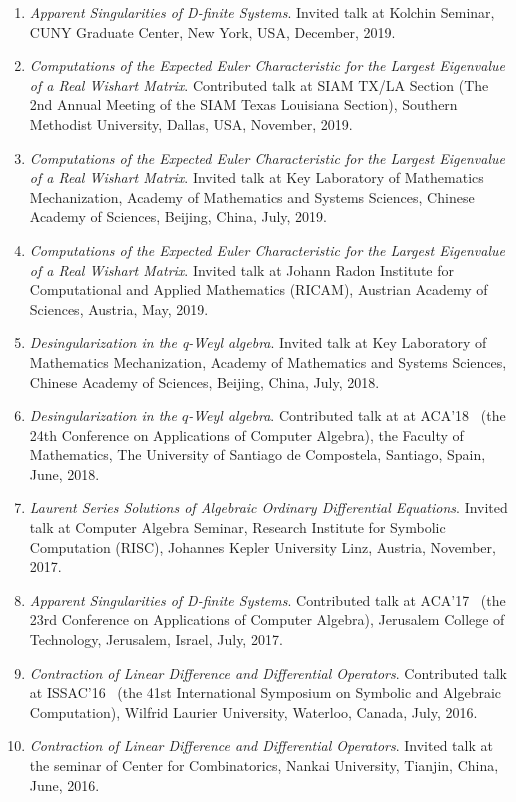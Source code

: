 \documentclass[a4paper,12pt]{article}
\begin{document}
\begin{enumerate}
\item {\em Apparent Singularities of D-finite Systems}.
Invited talk at Kolchin Seminar, CUNY Graduate Center, New York, USA, December, 2019. 
\item {\em Computations of the Expected Euler Characteristic for the Largest Eigenvalue of a Real Wishart Matrix}.
Contributed talk at SIAM TX/LA Section (The 2nd Annual Meeting of the SIAM Texas Louisiana Section), Southern Methodist University, Dallas, USA, November, 2019.
\item {\em Computations of the Expected Euler Characteristic for the Largest Eigenvalue of a Real Wishart Matrix}.
Invited talk at Key Laboratory of Mathematics Mechanization, Academy of Mathematics and Systems Sciences,
 Chinese Academy of Sciences, Beijing, China, July, 2019. 
\item {\em Computations of the Expected Euler Characteristic for the Largest Eigenvalue of a Real Wishart Matrix}.
Invited talk at Johann Radon Institute for Computational and Applied Mathematics (RICAM), Austrian Academy of Sciences, 
Austria, May, 2019.
 \item {\em Desingularization in the q-Weyl algebra}. 
 Invited talk at Key Laboratory of Mathematics Mechanization, Academy of Mathematics and Systems Sciences,
 Chinese Academy of Sciences, Beijing, China, July, 2018. 
 \item {\em Desingularization in the $q$-Weyl algebra}. 
 Contributed talk at at ACA'18 
 \ (the 24th Conference on Applications of Computer Algebra), the Faculty of Mathematics, 
 The University of Santiago de Compostela, Santiago, Spain, June, 2018.
 \item {\em Laurent Series Solutions of Algebraic Ordinary Differential Equations}. 
 Invited talk at Computer Algebra Seminar, Research Institute for Symbolic Computation (RISC), Johannes Kepler University Linz, 
 Austria, November, 2017.
 \item {\em Apparent Singularities of D-finite Systems}. Contributed talk at ACA'17 
 \ (the 23rd Conference on Applications of Computer Algebra), Jerusalem College of Technology, Jerusalem, Israel, July, 2017.
 \item {\em Contraction of Linear Difference and Differential Operators}. Contributed talk at ISSAC'16 
 \ (the 41st International Symposium on Symbolic and Algebraic Computation), Wilfrid Laurier University, Waterloo, Canada, July, 2016.
 \item {\em Contraction of Linear Difference and Differential Operators}.
       Invited talk at the seminar of Center for Combinatorics, Nankai University, Tianjin, China, June, 2016.

\end{enumerate}
\end{document}
